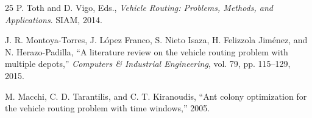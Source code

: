 \documentclass[10pt,conference]{IEEEtran}
\begin{document}
\begin{thebibliography}{25}
 P. Toth and D. Vigo, Eds., \textit{Vehicle Routing: Problems, Methods, and Applications}. SIAM, 2014.

 J. R. Montoya-Torres, J. L{\'o}pez Franco, S. Nieto Isaza, H. Felizzola Jim{\'e}nez, and N. Herazo-Padilla, ``A literature review on the vehicle routing problem with multiple depots,'' \textit{Computers \& Industrial Engineering}, vol. 79, pp. 115--129, 2015.

 M. Macchi, C. D. Tarantilis, and C. T. Kiranoudis, ``Ant colony optimization for the vehicle routing problem with time windows,'' 2005.

\end{thebibliography}
\end{document}
